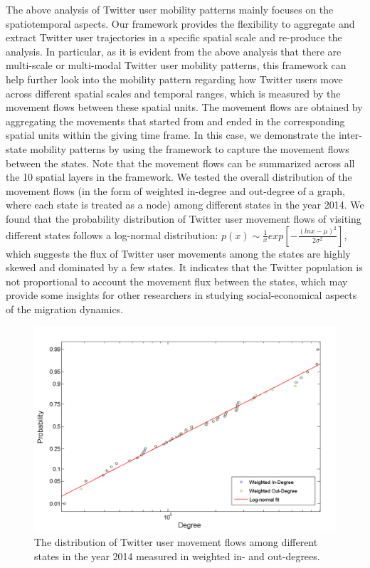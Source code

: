 \documentclass[ijgi,article,accept,moreauthors,pdftex,10pt,a4paper]{mdpi}
\theoremstyle{mdpi}
\newcounter{ex}
\newcounter{re}
\theoremstyle{mdpidefinition}
\begin{document}
The above analysis of Twitter user mobility patterns mainly focuses on the spatiotemporal aspects.
Our framework provides the flexibility to aggregate and extract Twitter user trajectories in a specific spatial scale and re-produce the analysis.
In particular, as it is evident from the above analysis that there are multi-scale or multi-modal Twitter user mobility patterns, this framework can help further look into the mobility pattern regarding how Twitter users move across different spatial scales and temporal ranges, which is measured by the movement flows between these spatial units.
The movement flows are obtained by aggregating the movements that started from and ended in the corresponding spatial units within the giving time frame.
In this case, we demonstrate the inter-state mobility patterns by using the framework to capture the movement flows between the states.
Note that the movement flows can be summarized across all the 10 spatial layers in the framework.
We tested the overall distribution of the movement flows (in the form of weighted in-degree and out-degree of a graph, where each state is treated as a node) among different states in the year 2014.
We found that the probability distribution of Twitter user movement flows of visiting different states follows a log-normal distribution: $p(x)\sim \frac{1}{x}exp[-\frac{(lnx - \mu)^{2}}{2\sigma^{2}}]$, which suggests the flux of Twitter user movements among the states are highly skewed and dominated by a few states.
It indicates that the Twitter population is not proportional to account the movement flux between the states, which may provide some insights for other researchers in studying social-economical aspects of the migration dynamics.

\begin{figure}[ht]
\centering
\includegraphics[width=0.8\linewidth]{./figures/degree}
\caption{The distribution of Twitter user movement flows among different states in the year 2014 measured in weighted in- and out-degrees.}
\label{fig:state_flow}
\end{figure}
\FloatBarrier
\end{document}
